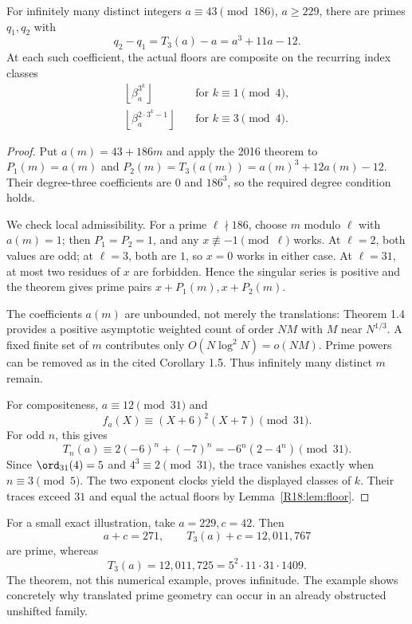 \documentclass[11pt,a4paper]{article}
\theoremstyle{definition}\newtheorem{definition}[theorem]{Definition}
\theoremstyle{remark}\newtheorem{remark}[theorem]{Remark}
\newcommand{\floor}[1]{\left\lfloor#1\right\rfloor}
\begin{document}
\begin{proposition}\label{R18:prop:pair}
For infinitely many distinct integers $a\equiv43\pmod{186}$,
$a\ge229$, there are primes $q_1,q_2$ with
\[
 q_2-q_1=T_3(a)-a=a^3+11a-12.
\]
At each such coefficient, the actual floors are composite on the
recurring index classes
\begin{align*}
 \floor{\beta_a^{3^k}}&\quad\text{for }k\equiv1\pmod4,\\
 \floor{\beta_a^{2\cdot3^k-1}}&\quad\text{for }k\equiv3\pmod4.
\end{align*}
\end{proposition}
\begin{proof}
Put $a(m)=43+186m$ and apply the 2016 theorem to
$P_1(m)=a(m)$ and $P_2(m)=T_3(a(m))=a(m)^3+12a(m)-12$.
Their degree-three coefficients are $0$ and $186^3$, so the required
degree condition holds.

We check local admissibility. For a prime $\ell\nmid186$, choose $m$
modulo $\ell$ with $a(m)=1$; then $P_1=P_2=1$, and any
$x\not\equiv-1\pmod\ell$ works. At $\ell=2$, both values are odd;
at $\ell=3$, both are $1$, so $x=0$ works in either case. At
$\ell=31$, at most two residues of $x$ are forbidden. Hence the
singular series is positive and the theorem gives prime pairs
$x+P_1(m),x+P_2(m)$.

The coefficients $a(m)$ are unbounded, not merely the translations:
Theorem 1.4 provides a positive asymptotic weighted count of order $NM$
with $M$ near $N^{1/3}$. A fixed finite set of $m$ contributes only
$O(N\log^2N)=o(NM)$. Prime powers can be removed as in the cited
Corollary 1.5. Thus infinitely many distinct $m$ remain.

For compositeness, $a\equiv12\pmod{31}$ and
\[
 f_a(X)\equiv(X+6)^2(X+7)\pmod{31}.
\]
For odd $n$, this gives
\[
 T_n(a)\equiv2(-6)^n+(-7)^n=-6^n(2-4^n)\pmod{31}.
\]
Since $\ord_{31}(4)=5$ and $4^3\equiv2\pmod{31}$, the trace
vanishes exactly when $n\equiv3\pmod5$. The two exponent clocks
yield the displayed classes of $k$. Their traces exceed $31$ and
equal the actual floors by Lemma~\ref{R18:lem:floor}.
\end{proof}

For a small exact illustration, take $a=229,c=42$. Then
\[
 a+c=271,\qquad T_3(a)+c=12{,}011{,}767
\]
are prime, whereas
\[
 T_3(a)=12{,}011{,}725=5^2\cdot11\cdot31\cdot1409.
\]
The theorem, not this numerical example, proves infinitude. The example
shows concretely why translated prime geometry can occur in an already
obstructed unshifted family.
\end{document}
